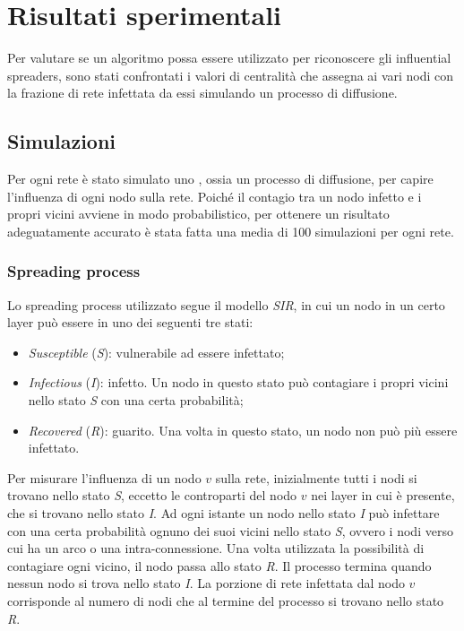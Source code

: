 \chapter{Risultati sperimentali}
Per valutare se un algoritmo possa essere utilizzato per riconoscere gli influential spreaders, 
sono stati confrontati i valori di centralità che assegna ai vari nodi con la frazione di 
rete infettata da essi simulando un processo di diffusione.

\section{Simulazioni}
Per ogni rete è stato simulato uno \spproc, ossia un processo di diffusione, per capire l'influenza 
di ogni nodo sulla rete. Poiché il contagio tra un nodo infetto e i propri vicini avviene in modo 
probabilistico, per ottenere un risultato adeguatamente accurato è stata fatta una media di \num{100} simulazioni per ogni rete.

\subsection{Spreading process}
Lo spreading process utilizzato segue il modello \emph{SIR}, in cui un nodo in un certo layer può essere in 
uno dei seguenti tre stati:
\begin{itemize}
    \item \emph{Susceptible} (\emph{S}): vulnerabile ad essere infettato;
    \item \emph{Infectious} (\emph{I}): infetto. Un nodo in questo stato può contagiare
        i propri vicini nello stato \emph{S} con una certa probabilità;
    \item \emph{Recovered} (\emph{R}): guarito. Una volta in questo stato, un nodo non può più essere
        infettato.
\end{itemize}
Per misurare l'influenza di un nodo $v$ sulla rete, inizialmente tutti i nodi si trovano nello stato \emph{S}, 
eccetto le controparti del nodo $v$ nei layer in cui è presente, che si trovano nello stato \emph{I}.
Ad ogni istante un nodo nello stato \emph{I} può infettare con una certa probabilità ognuno dei suoi vicini 
nello stato \emph{S}, ovvero i nodi verso cui ha un arco o una intra-connessione. 
Una volta utilizzata la possibilità di contagiare ogni vicino, il nodo passa allo stato \emph{R}.
Il processo termina quando nessun nodo si trova nello stato \emph{I}.
La porzione di rete infettata dal nodo $v$ corrisponde al numero di nodi che al termine del processo si trovano nello 
stato \emph{R}.

